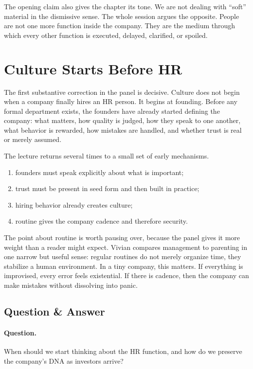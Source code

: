 The opening claim also gives the chapter its tone. We are not dealing with ``soft'' material in the dismissive sense. The whole session argues the opposite. People are not one more function inside the company. They are the medium through which every other function is executed, delayed, clarified, or spoiled.

\section{Culture Starts Before HR}

The first substantive correction in the panel is decisive. Culture does not begin when a company finally hires an HR person. It begins at founding. Before any formal department exists, the founders have already started defining the company: what matters, how quality is judged, how they speak to one another, what behavior is rewarded, how mistakes are handled, and whether trust is real or merely assumed.

The lecture returns several times to a small set of early mechanisms.

\begin{enumerate}
\item founders must speak explicitly about what is important;
\item trust must be present in seed form and then built in practice;
\item hiring behavior already creates culture;
\item routine gives the company cadence and therefore security.
\end{enumerate}

The point about routine is worth pausing over, because the panel gives it more weight than a reader might expect. Vivian compares management to parenting in one narrow but useful sense: regular routines do not merely organize time, they stabilize a human environment. In a tiny company, this matters. If everything is improvised, every error feels existential. If there is cadence, then the company can make mistakes without dissolving into panic.

\subsection{Question \& Answer}

\paragraph{Question.} When should we start thinking about the HR function, and how do we preserve the company's DNA as investors arrive?

